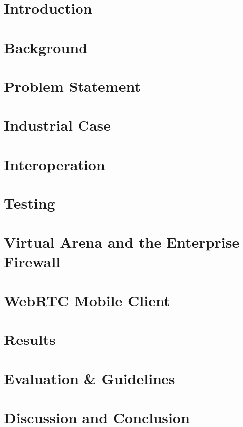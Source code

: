 \chapter{Introduction}


\chapter{Background}


\chapter{Problem Statement}


\chapter{Industrial Case}


\chapter{Interoperation}


\chapter{Testing}


\chapter{Virtual Arena and the Enterprise Firewall}


\chapter{WebRTC Mobile Client}


\chapter{Results}


\chapter{Evaluation \& Guidelines}


\chapter{Discussion and Conclusion}
